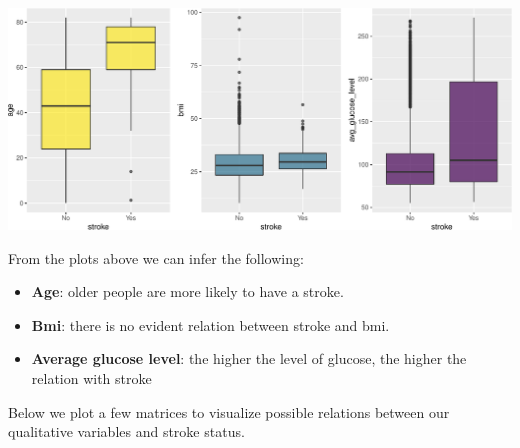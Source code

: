 \documentclass[
]{article}
\begin{document}
\includegraphics{report_files/figure-latex/unnamed-chunk-4-1.pdf}

From the plots above we can infer the following:

\begin{itemize}
\item \textbf{Age}: older people are more likely to have a stroke.
\item \textbf{Bmi}: there is no evident relation between stroke and bmi.
\item \textbf{Average glucose level}: the higher the level of glucose, the higher the relation with stroke
\end{itemize}

Below we plot a few matrices to visualize possible relations between our
qualitative variables and stroke status.\\
\end{document}
